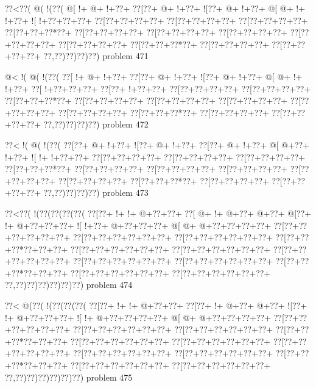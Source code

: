 \vbox{\vbox{\goo
\0??<\0??(\- @(\- !(\0??(
\- @[\- !+\- @+\- !+\0??+
\0??[\0??+\- @+\- !+\0??+
\- ![\0??+\- @+\- !+\0??+
\- @[\- @+\- !+\- !+\0??+
\- ![\- !+\0??+\0??+\0??+
\0??[\0??+\0??+\0??+\0??+
\0??[\0??+\0??+\0??+\0??+
\0??[\0??+\0??+\0??+\0??+
\0??[\0??+\0??+\0??*\0??+
\0??[\0??+\0??+\0??+\0??+
\0??[\0??+\0??+\0??+\0??+
\0??[\0??+\0??+\0??+\0??+
\0??[\0??+\0??+\0??+\0??+
\0??[\0??+\0??+\0??+\0??+
\0??[\0??+\0??+\0??*\0??+
\0??[\0??+\0??+\0??+\0??+
\0??[\0??+\0??+\0??+\0??+
\0??,\0??)\0??)\0??)\0??)
}
\hfil problem 471\hfil\break
}

\vbox{\vbox{\goo
\- @<\- !(\- @(\- !(\0??(
\0??[\- !+\- @+\- !+\0??+
\0??[\0??+\- @+\- !+\0??+
\- ![\0??+\- @+\- !+\0??+
\- @[\- @+\- !+\- !+\0??+
\0??[\- !+\0??+\0??+\0??+
\0??[\0??+\- !+\0??+\0??+
\0??[\0??+\0??+\0??+\0??+
\0??[\0??+\0??+\0??+\0??+
\0??[\0??+\0??+\0??*\0??+
\0??[\0??+\0??+\0??+\0??+
\0??[\0??+\0??+\0??+\0??+
\0??[\0??+\0??+\0??+\0??+
\0??[\0??+\0??+\0??+\0??+
\0??[\0??+\0??+\0??+\0??+
\0??[\0??+\0??+\0??*\0??+
\0??[\0??+\0??+\0??+\0??+
\0??[\0??+\0??+\0??+\0??+
\0??,\0??)\0??)\0??)\0??)
}
\hfil problem 472\hfil\break
}

\vbox{\vbox{\goo
\0??<\- !(\- @(\- !(\0??(
\0??[\0??+\- @+\- !+\0??+
\- ![\0??+\- @+\- !+\0??+
\0??[\0??+\- @+\- !+\0??+
\- @[\- @+\0??+\- !+\0??+
\- ![\- !+\- !+\0??+\0??+
\0??[\0??+\0??+\0??+\0??+
\0??[\0??+\0??+\0??+\0??+
\0??[\0??+\0??+\0??+\0??+
\0??[\0??+\0??+\0??*\0??+
\0??[\0??+\0??+\0??+\0??+
\0??[\0??+\0??+\0??+\0??+
\0??[\0??+\0??+\0??+\0??+
\0??[\0??+\0??+\0??+\0??+
\0??[\0??+\0??+\0??+\0??+
\0??[\0??+\0??+\0??*\0??+
\0??[\0??+\0??+\0??+\0??+
\0??[\0??+\0??+\0??+\0??+
\0??,\0??)\0??)\0??)\0??)
}
\hfil problem 473\hfil\break
}

\vbox{\vbox{\goo
\0??<\0??(\- !(\0??(\0??(\0??(\0??(
\0??[\0??+\- !+\- !+\- @+\0??+\0??+
\0??[\- @+\- !+\- @+\0??+\- @+\0??+
\- @[\0??+\- !+\- @+\0??+\0??+\0??+
\- ![\- !+\0??+\- @+\0??+\0??+\0??+
\- @[\- @+\- @+\0??+\0??+\0??+\0??+
\0??[\0??+\0??+\0??+\0??+\0??+\0??+
\0??[\0??+\0??+\0??+\0??+\0??+\0??+
\0??[\0??+\0??+\0??+\0??+\0??+\0??+
\0??[\0??+\0??+\0??*\0??+\0??+\0??+
\0??[\0??+\0??+\0??+\0??+\0??+\0??+
\0??[\0??+\0??+\0??+\0??+\0??+\0??+
\0??[\0??+\0??+\0??+\0??+\0??+\0??+
\0??[\0??+\0??+\0??+\0??+\0??+\0??+
\0??[\0??+\0??+\0??+\0??+\0??+\0??+
\0??[\0??+\0??+\0??*\0??+\0??+\0??+
\0??[\0??+\0??+\0??+\0??+\0??+\0??+
\0??[\0??+\0??+\0??+\0??+\0??+\0??+
\0??,\0??)\0??)\0??)\0??)\0??)\0??)
}
\hfil problem 474\hfil\break
}

\vbox{\vbox{\goo
\0??<\- @(\0??(\- !(\0??(\0??(\0??(
\0??[\0??+\- !+\- !+\- @+\0??+\0??+
\0??[\0??+\- !+\- @+\0??+\- @+\0??+
\- ![\0??+\- !+\- @+\0??+\0??+\0??+
\- ![\- !+\- @+\0??+\0??+\0??+\0??+
\- @[\- @+\- @+\0??+\0??+\0??+\0??+
\0??[\0??+\0??+\0??+\0??+\0??+\0??+
\0??[\0??+\0??+\0??+\0??+\0??+\0??+
\0??[\0??+\0??+\0??+\0??+\0??+\0??+
\0??[\0??+\0??+\0??*\0??+\0??+\0??+
\0??[\0??+\0??+\0??+\0??+\0??+\0??+
\0??[\0??+\0??+\0??+\0??+\0??+\0??+
\0??[\0??+\0??+\0??+\0??+\0??+\0??+
\0??[\0??+\0??+\0??+\0??+\0??+\0??+
\0??[\0??+\0??+\0??+\0??+\0??+\0??+
\0??[\0??+\0??+\0??*\0??+\0??+\0??+
\0??[\0??+\0??+\0??+\0??+\0??+\0??+
\0??[\0??+\0??+\0??+\0??+\0??+\0??+
\0??,\0??)\0??)\0??)\0??)\0??)\0??)
}
\hfil problem 475\hfil\break
}

